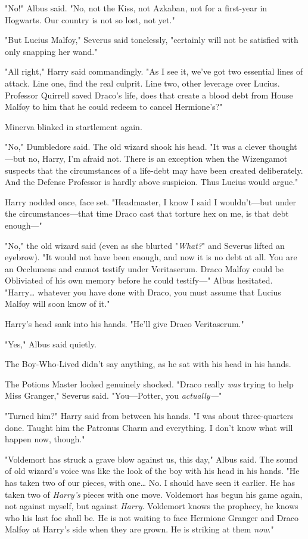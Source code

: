 "No!" Albus said. "No, not the Kiss, not Azkaban, not for a first-year in 
Hogwarts. Our country is not so lost, not yet."

"But Lucius Malfoy," Severus said tonelessly, "certainly will not be satisfied 
with only snapping her wand."

"All right," Harry said commandingly. "As I see it, we've got two essential 
lines of attack. Line one, find the real culprit. Line two, other leverage over 
Lucius. Professor Quirrell saved Draco's life, does that create a blood debt 
from House Malfoy to him that he could redeem to cancel Hermione's?"

Minerva blinked in startlement again.

"No," Dumbledore said. The old wizard shook his head. "It was a clever 
thought---but no, Harry, I'm afraid not. There is an exception when the 
Wizengamot suspects that the circumstances of a life-debt may have been created 
deliberately. And the Defense Professor is hardly above suspicion. Thus Lucius 
would argue."

Harry nodded once, face set. "Headmaster, I know I said I wouldn't---but under 
the circumstances---that time Draco cast that torture hex on me, is that debt 
enough---"

"No," the old wizard said (even as she blurted "\emph{What?}" and Severus 
lifted an eyebrow). "It would not have been enough, and now it is no debt at 
all. You are an Occlumens and cannot testify under Veritaserum. Draco Malfoy 
could be Obliviated of his own memory before he could testify---" Albus 
hesitated. "Harry{\ldots} whatever you have done with Draco, you must assume 
that Lucius Malfoy will soon know of it."

Harry's head sank into his hands. "He'll give Draco Veritaserum."

"Yes," Albus said quietly.

The Boy-Who-Lived didn't say anything, as he sat with his head in his hands.

The Potions Master looked genuinely shocked. "Draco really \emph{was} trying to 
help Miss Granger," Severus said. "You---Potter, you \emph{actually---}"

"Turned him?" Harry said from between his hands. "I was about three-quarters 
done. Taught him the Patronus Charm and everything. I don't know what will 
happen now, though."

"Voldemort has struck a grave blow against us, this day," Albus said. The sound 
of old wizard's voice was like the look of the boy with his head in his hands. 
"He has taken two of our pieces, with one{\ldots} No. I should have seen it 
earlier. He has taken two of \emph{Harry's} pieces with one move. Voldemort has 
begun his game again, not against myself, but against \emph{Harry}. Voldemort 
knows the prophecy, he knows who his last foe shall be. He is not waiting to 
face Hermione Granger and Draco Malfoy at Harry's side when they are grown. He 
is striking at them \emph{now}."

